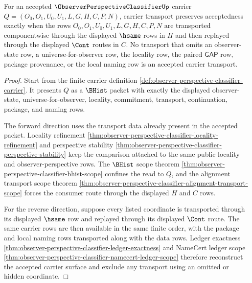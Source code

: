 \begin{theorem}
\label{thm:observerperspectiveclassifier-carrier-transport}
For an accepted $\ObserverPerspectiveClassifierUp$ carrier $Q=(O_0,O_1,U_0,U_1,L,G,H,C,P,N)$, carrier transport preserves acceptedness exactly when the rows $O_0,O_1,U_0,U_1,L,G,H,C,P,N$ are transported componentwise through the displayed $\hsame$ rows in $H$ and then replayed through the displayed $\Cont$ routes in $C$. No transport that omits an observer-state row, a universe-for-observer row, the locality row, the paired $\mathsf{GAP}$ row, package provenance, or the local naming row is an accepted carrier transport.
\end{theorem}
\begin{proof}
Start from the finite carrier definition \autoref{def:observer-perspective-classifier-carrier}. It presents $Q$ as a $\BHist$ packet with exactly the displayed observer-state, universe-for-observer, locality, commitment, transport, continuation, package, and naming rows.

The forward direction uses the transport data already present in the accepted packet. Locality refinement \autoref{thm:observer-perspective-classifier-locality-refinement} and perspective stability \autoref{thm:observer-perspective-classifier-perspective-stability} keep the comparison attached to the same public locality and observer-perspective rows. The $\BHist$ scope theorem \autoref{thm:observer-perspective-classifier-bhist-scope} confines the read to $Q$, and the alignment transport scope theorem \autoref{thm:observer-perspective-classifier-alignment-transport-scope} forces the consumer route through the displayed $H$ and $C$ rows.

For the reverse direction, suppose every listed coordinate is transported through its displayed $\hsame$ row and replayed through its displayed $\Cont$ route. The same carrier rows are then available in the same finite order, with the package and local naming rows transported along with the data rows. Ledger exactness \autoref{thm:observer-perspective-classifier-ledger-exactness} and NameCert ledger scope \autoref{thm:observer-perspective-classifier-namecert-ledger-scope} therefore reconstruct the accepted carrier surface and exclude any transport using an omitted or hidden coordinate.
\end{proof}


